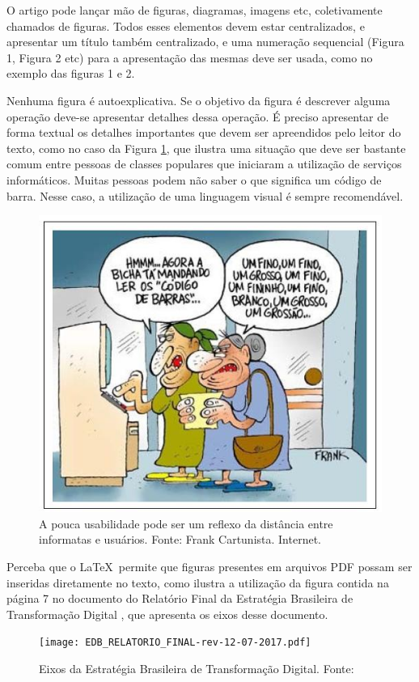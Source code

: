 \documentclass[12pt]{article}
\begin{document}
	O artigo pode lançar mão de figuras, diagramas, imagens etc, coletivamente chamados de figuras. Todos esses elementos devem estar centralizados, e apresentar um título também centralizado, e uma numeração sequencial (Figura 1, Figura 2 etc) para a apresentação das mesmas deve ser usada, como no exemplo das figuras 1 e 2. 
	
	Nenhuma figura é autoexplicativa. Se o objetivo da figura é descrever alguma operação deve-se apresentar detalhes dessa operação. 
	É preciso apresentar de forma textual os detalhes importantes que devem ser apreendidos pelo leitor do texto, como no caso da Figura \ref{fig:1}, que ilustra uma situação que deve ser bastante comum entre pessoas de classes populares que iniciaram a utilização de serviços informáticos. Muitas pessoas podem não saber o que significa um código de barra. Nesse caso, a utilização de uma linguagem visual é sempre recomendável.
	
	\begin{figure}[ht]
		\centering
		\includegraphics[width=.7\textwidth]{piada-codigodebarras.JPG}
		\caption{A pouca usabilidade pode ser um reflexo da distância entre informatas e usuários. Fonte: Frank Cartunista. Internet. }\label{fig:1}
	\end{figure}
	
	Perceba que o \LaTeX\ permite que figuras presentes em arquivos PDF possam ser inseridas diretamente no texto, como ilustra a utilização da figura contida na página 7 no documento do Relatório Final da Estratégia Brasileira de Transformação Digital \citep{gt_interministerial_port._n_842/2017_estrategia_2017}, que apresenta os eixos desse documento.
	
	\begin{figure}[ht]
		\centering
		\texttt{[image: EDB\_RELATORIO\_FINAL-rev-12-07-2017.pdf]}
		\caption{Eixos da Estratégia Brasileira de Transformação Digital.\label{EBTD} Fonte: \citep[p. 7]{gt_interministerial_port._n_842/2017_estrategia_2017}}
	\end{figure}
	
\end{document}
